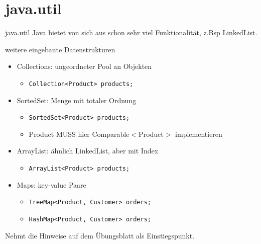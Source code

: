 \documentclass[18pt]{beamer}
\begin{document}
\section{java.util}
\begin{frame}[fragile]{java.util}
Java bietet von sich aus schon sehr viel Funktionalität, z.Bsp LinkedList. \pause
\begin{example}{weitere eingebaute Datenstrukturen} \pause
\begin{itemize}
	\item Collections: ungeordneter Pool an Objekten 
	\begin{itemize}
		\item \lstinline{Collection<Product> products;} \pause
	\end{itemize}
	\item SortedSet: Menge mit totaler Ordnung
	\begin{itemize}
		\item \lstinline{SortedSet<Product> products;} \pause
		\item Product MUSS hier Comparable$<$Product$>$ implementieren \pause
	\end{itemize}
	\item ArrayList: ähnlich LinkedList, aber mit Index
	\begin{itemize}
		\item \lstinline{ArrayList<Product> products;} \pause
	\end{itemize}
	\item Maps: key-value Paare 
	\begin{itemize}
		\item \lstinline{TreeMap<Product, Customer> orders;}
		\item \lstinline{HashMap<Product, Customer> orders;}
	\end{itemize}
\end{itemize}
\end{example}
Nehmt die Hinweise auf dem Übungsblatt als Einstiegspunkt.
\end{frame}


\appendix
\beginbackup


\backupend
\end{document}
